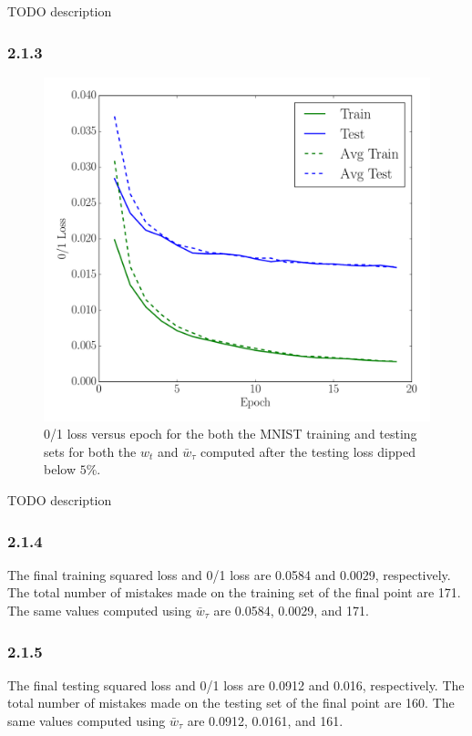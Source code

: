 \documentclass[12pt]{amsart}
\begin{document}
TODO description

\subsubsection*{2.1.3}

\begin{figure}[H]
	\includegraphics[width=\columnwidth]{pca_01_loss_masked.pdf}
    \caption{0/1 loss versus epoch for the both the MNIST training and testing sets for both the $w_t$ and $\bar{w}_{\tau}$ computed after the testing loss dipped below $5\%$.}
    \label{fig:pca_01_loss_masked}
\end{figure}

TODO description

\subsubsection*{2.1.4}

The final training squared loss and 0/1 loss are 0.0584 and 0.0029, respectively.  The total number of mistakes made on the training set of the final point are 171.  The same values computed using $\bar{w}_{\tau}$ are 0.0584, 0.0029, and 171.

\subsubsection*{2.1.5}

The final testing squared loss and 0/1 loss are 0.0912 and 0.016, respectively.  The total number of mistakes made on the testing set of the final point are 160.  The same values computed using $\bar{w}_{\tau}$ are 0.0912, 0.0161, and 161.
\end{document}
